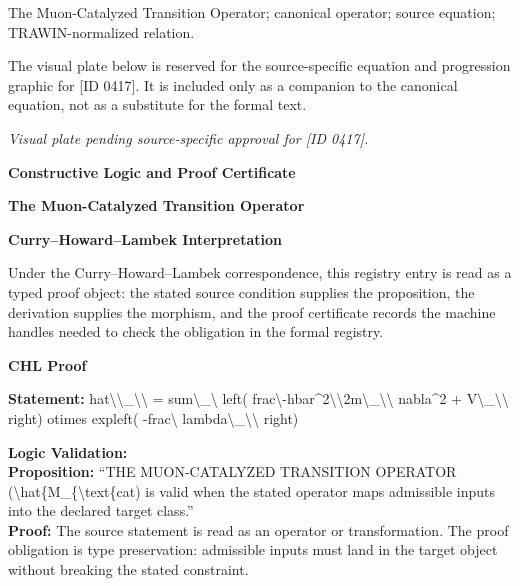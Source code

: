 The Muon-Catalyzed Transition Operator; canonical operator; source equation; TRAWIN-normalized relation.
\endgroup

\begingroup\footnotesize\sloppy
The visual plate below is reserved for the source-specific equation and progression graphic for [ID 0417]. It is included only as a companion to the canonical equation, not as a substitute for the formal text.
\par\endgroup
\begingroup\footnotesize\itshape
Visual plate pending source-specific approval for [ID 0417].
\par\endgroup

\clearpage
\begingroup\tzpsupportsetup
\noindent\textbf{\fontsize{10.8pt}{12.8pt}\selectfont [ID 0417] Constructive Logic and Proof Certificate}\par
\noindent\textbf{\fontsize{10pt}{12pt}\selectfont The Muon-Catalyzed Transition Operator}\par
\vspace{0.45em}
\begingroup
\footnotesize
\setlength{\parskip}{0.22em}
\setlength{\parindent}{0pt}
\noindent\textbf{Curry--Howard--Lambek Interpretation}\par
Under the Curry--Howard--Lambek correspondence, this registry entry is read as a typed proof
object: the stated source condition supplies the proposition, the derivation supplies the
morphism, and the proof certificate records the machine handles needed to check the obligation
in the formal registry.

\vspace{0.45em}
\noindent\textbf{CHL Proof}\par
\textbf{Statement:} hat\textbackslash{}\textbackslash{}\_\textbackslash{}\textbackslash{} = sum\textbackslash{}\_\textbackslash{} left( frac\textbackslash{}-hbar\textasciicircum{}2\textbackslash{}\textbackslash{}2m\textbackslash{}\_\textbackslash{}\textbackslash{} nabla\textasciicircum{}2 + V\textbackslash{}\_\textbackslash{}\textbackslash{} right) otimes expleft(
-frac\textbackslash{} lambda\textbackslash{}\_\textbackslash{}\textbackslash{} right)

\textbf{Logic Validation:}\\
\textbf{Proposition:} ``THE MUON-CATALYZED TRANSITION OPERATOR (\textbackslash{}hat\{M\_\{\textbackslash{}text\{cat) is valid when the stated
operator maps admissible inputs into the declared target class.''\\
\textbf{Proof:} The source statement is read as an operator or transformation. The proof obligation is
type preservation: admissible inputs must land in the target object without breaking the
stated constraint.

